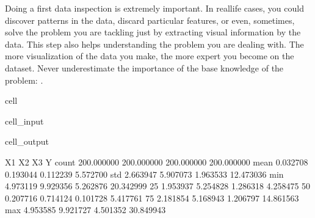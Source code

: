 \documentclass[letterpaper,10pt,english]{jupyterBook}
\begin{document}
\begin{sphinxShadowBox}
\sphinxstylesidebartitle{}

\sphinxAtStartPar
Doing a first data inspection is extremely important. In real\sphinxhyphen{}life cases, you could discover patterns in the data, discard particular features, or even, sometimes, solve the problem you are tackling just by extracting visual information by the data. This step also helps understanding the problem you are dealing with. The more visualization of the data you make, the more expert you become on the dataset. Never underestimate the importance of the base knowledge of the problem: .
\end{sphinxShadowBox}

\begin{sphinxuseclass}{cell}\begin{sphinxVerbatimInput}

\begin{sphinxuseclass}{cell_input}
\begin{sphinxVerbatim}[commandchars=\\\{\}]
  
 
\end{sphinxVerbatim}

\end{sphinxuseclass}\end{sphinxVerbatimInput}
\begin{sphinxVerbatimOutput}

\begin{sphinxuseclass}{cell_output}
\begin{sphinxVerbatim}[commandchars=\\\{\}]
               X1          X2          X3           Y
count  200.000000  200.000000  200.000000  200.000000
mean     0.032708   \PYGZhy{}0.193044   \PYGZhy{}0.112239    5.572700
std      2.663947    5.907073    1.963533   12.473036
min     \PYGZhy{}4.973119   \PYGZhy{}9.929356   \PYGZhy{}5.262876  \PYGZhy{}20.342999
25\PYGZpc{}     \PYGZhy{}1.953937   \PYGZhy{}5.254828   \PYGZhy{}1.286318   \PYGZhy{}4.258475
50\PYGZpc{}      0.207716   \PYGZhy{}0.714124   \PYGZhy{}0.101728    5.417761
75\PYGZpc{}      2.181854    5.168943    1.206797   14.861563
max      4.953585    9.921727    4.501352   30.849943
\end{sphinxVerbatim}


\end{sphinxuseclass}
\end{sphinxVerbatimOutput}
\end{sphinxuseclass}
\end{document}
